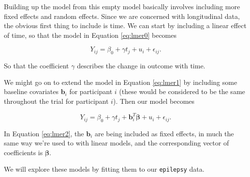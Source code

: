 \documentclass[
  openany]{book}
\newenvironment{Shaded}{\begin{snugshade}}{\end{snugshade}}
\newcommand{\AttributeTok}[1]{\textcolor[rgb]{0.13,0.29,0.53}{#1}}
\newcommand{\DecValTok}[1]{\textcolor[rgb]{0.00,0.00,0.81}{#1}}
\newcommand{\DocumentationTok}[1]{\textcolor[rgb]{0.56,0.35,0.01}{\textbf{\textit{#1}}}}
\newcommand{\FunctionTok}[1]{\textcolor[rgb]{0.13,0.29,0.53}{\textbf{#1}}}
\newcommand{\NormalTok}[1]{#1}
\newcommand{\OtherTok}[1]{\textcolor[rgb]{0.56,0.35,0.01}{#1}}
\newcommand{\SpecialCharTok}[1]{\textcolor[rgb]{0.81,0.36,0.00}{\textbf{#1}}}
\theoremstyle{definition}
\theoremstyle{definition}
\theoremstyle{definition}
\theoremstyle{definition}
\theoremstyle{remark}
\begin{document}
Building up the model from this empty model basically involves including more fixed effects and random effects. Since we are concerned with longitudinal data, the obvious first thing to include is time. We can start by including a linear effect of time, so that the model in Equation \eqref{eq:lmer0} becomes

\begin{equation}
Y_{ij} = \beta_0 + \gamma t_j + u_{i} + \epsilon_{ij}.
\label{eq:lmer1}
\end{equation}

So that the coefficient \(\gamma\) describes the change in outcome with time.

We might go on to extend the model in Equation \eqref{eq:lmer1} by including some baseline covariates \(\mathbf{b}_{i}\) for participant \(i\) (these would be considered to be the same throughout the trial for participant \(i\)). Then our model becomes

\begin{equation}
Y_{ij} = \beta_0 + \gamma t_j + \mathbf{b}_i^T\boldsymbol\beta + u_{i} + \epsilon_{ij}.
\label{eq:lmer2}
\end{equation}

In Equation \eqref{eq:lmer2}, the \(\mathbf{b}_i\) are being included as fixed effects, in much the same way we're used to with linear models, and the corresponding vector of coefficients is \(\boldsymbol\beta\).

We will explore these models by fitting them to our \texttt{epilepsy} data.

\begin{Shaded}
\end{Shaded}
\end{document}
